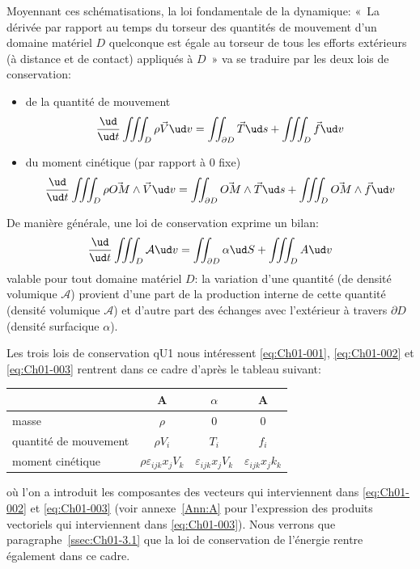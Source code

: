 Moyennant ces schématisations, la loi fondamentale de la dynamique: «~La dérivée par rapport au temps du torseur des quantités de mouvement d'un domaine matériel $D$ quelconque est égale au torseur de tous les efforts extérieurs (à distance et de contact) appliqués à $D$~» va se traduire par les deux lois de conservation:
\begin{itemize}
    \item de la quantité de mouvement
        \begin{equation}
            \frac{\ud}{\ud t}\iiint_D \rho\vec{V} \ud v =\iint_{\partial D}\vec{T}\ud s+\iiint_D\vec{f}\ud v
            \label{eq:Ch01-002}
        \end{equation}
    \item du moment cinétique (par rapport à 0 fixe)
        \begin{equation}
            \frac{\ud}{\ud t}\iiint_D \rho\vec{OM}\wedge\vec{V} \ud v =\iint_{\partial D}\vec{OM}\wedge\vec{T}\ud s+\iiint_D\vec{OM}\wedge\vec{f}\ud v
            \label{eq:Ch01-003}
        \end{equation}
\end{itemize}
De manière générale, une loi de conservation exprime un bilan:
\begin{equation}
    \frac{\ud}{\ud t}\iiint_D \mathcal{A} \ud v =\iint_{\partial D}\alpha\ud S +\iiint_D A\ud v
    \label{eq:Ch01-004}
\end{equation}
valable pour tout domaine matériel $D$: la variation d'une quantité (de densité volumique $\mathcal{A}$) provient d'une part de la production interne de cette quantité (densité volumique $\mathcal{A}$) et d'autre part des échanges avec l'extérieur à travers $\partial D$ (densité surfacique $\alpha$).

Les trois lois de conservation qU1 nous intéressent \eqref{eq:Ch01-001}, \eqref{eq:Ch01-002} et \eqref{eq:Ch01-003} rentrent dans ce cadre d'après le tableau suivant:
\begin{table}[h]\centering
    \begin{tabular}{l|c|c|c|}
        & A & $\alpha$ & A \\\hline
        masse & $\rho$ & 0 & 0\\\hline
        quantité de mouvement & $\rho V_i$ & $T_i$ & $f_i$ \\\hline
        moment cinétique & $\rho \varepsilon_{ijk}x_j V_k$ & $\varepsilon_{ijk}x_j V_k$ & $\varepsilon_{ijk}x_j k_k$
    \end{tabular}
\end{table}
où l'on a introduit les composantes des vecteurs qui interviennent dans \eqref{eq:Ch01-002} et \eqref{eq:Ch01-003} (voir annexe~\ref{Ann:A} pour l'expression des produits vectoriels qui interviennent dans \eqref{eq:Ch01-003}).
Nous verrons que paragraphe~\ref{ssec:Ch01-3.1} que la loi de conservation de l'énergie rentre également dans ce cadre.

